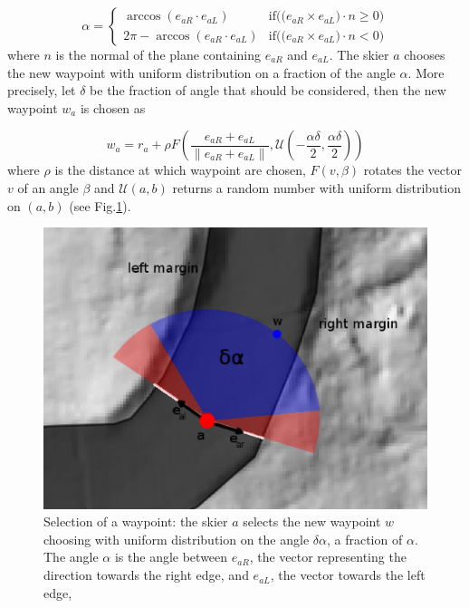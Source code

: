 \documentclass[12pt,a4paper,twoside]{book}
\newcommand{\norm}[1]{\lVert#1\rVert}
\begin{document}
\begin{equation}
\alpha=\begin{cases}
  \arccos(e_{aR} \cdot e_{aL}) & \text{if(($e_{aR} \times e_{aL})\cdot n \ge 0$)} \\
  2\pi-\arccos(e_{aR} \cdot e_{aL}) & \text{if(($e_{aR} \times e_{aL})\cdot n < 0$)}
\end{cases}
\end{equation}
where $n$ is the normal of the plane containing $e_{aR}$ and $e_{aL}$. The skier $a$ chooses the new waypoint with uniform distribution on a fraction of the angle $\alpha$. More precisely, let $\delta$ be the fraction of angle that should be considered, then the new waypoint $w_a$ is chosen as

\begin{equation}\label{new_waypoint}
w_a=r_a+\rho F\left(\frac{e_{aR}+e_{aL}}{\norm{e_{aR}+e_{aL}}},\mathcal{U}\left(-\frac{\alpha\delta}{2},\frac{\alpha\delta}{2}\right)\right)
\end{equation}
where $\rho$ is the distance at which waypoint are chosen, $F\left(v,\beta\right)$ rotates the vector $v$ of an angle $\beta$ and $\mathcal{U}(a,b)$ returns a random number with uniform distribution on $(a,b)$ (see Fig.\ref{new_waypoint_pic}).

\begin{figure}
  \begin{center}
    \includegraphics[width=\textwidth]{images/waypoint_new.eps}
    \caption{Selection of a waypoint: the skier $a$ selects the new waypoint $w$ choosing with uniform distribution on the angle $\delta\alpha$, a fraction of $\alpha$. The angle $\alpha$ is the angle between $e_{aR}$, the vector representing the direction towards the right edge, and $e_{aL}$, the vector towards the left edge,}\label{new_waypoint_pic}
  \end{center}
\end{figure}
\end{document}
